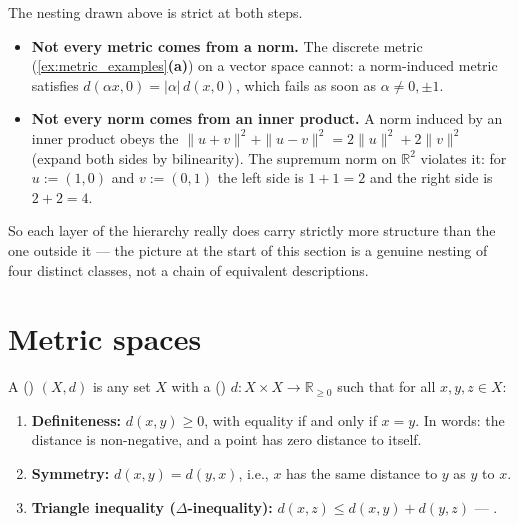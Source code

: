 \begin{remark}
\label{rem:norm_not_from_inner_product}
The nesting drawn above is strict at both steps.
\begin{itemize}
  \item \textbf{Not every metric comes from a norm.} The discrete metric
    (\cref{ex:metric_examples}\textbf{(a)}) on a vector space cannot: a norm-induced metric
    satisfies $d(\alpha x, 0) = |\alpha|\,d(x,0)$, which fails as soon as
    $\alpha \neq 0,\pm1$.
  \item \textbf{Not every norm comes from an inner product.} A norm induced by an inner product
    obeys the 
    $\|u+v\|^2 + \|u-v\|^2 = 2\|u\|^2 + 2\|v\|^2$ (expand both sides by bilinearity). The
    supremum norm on $\mathbb{R}^2$ violates it: for $u := (1,0)$ and $v := (0,1)$ the left side
    is $1+1 = 2$ and the right side is $2+2 = 4$.
\end{itemize}
So each layer of the hierarchy really does carry strictly more structure than the one outside
it --- the picture at the start of this section is a genuine nesting of four distinct classes,
not a chain of equivalent descriptions.
\end{remark}

\section{Metric spaces}
\label{sec:metric_spaces}

\begin{definition}
\label{def:metric_space}
A  () $(X,d)$ is any set $X$ with a
 () $d : X \times X \to \mathbb{R}_{\geq 0}$ such that for all
$x, y, z \in X$:
\begin{enumerate}[label=\textbf{(\alph*)}]
  \item \textbf{Definiteness:} $d(x,y) \geq 0$, with equality if and only if $x = y$. In words: the
    distance is non-negative, and a point has zero distance to itself.
  \item \textbf{Symmetry:} $d(x,y) = d(y,x)$, i.e., $x$ has the same distance to $y$ as $y$ to $x$.
  \item \textbf{Triangle inequality ($\Delta$-inequality):} $d(x,z) \leq d(x,y) + d(y,z)$ ---
    .
\end{enumerate}
\end{definition}

